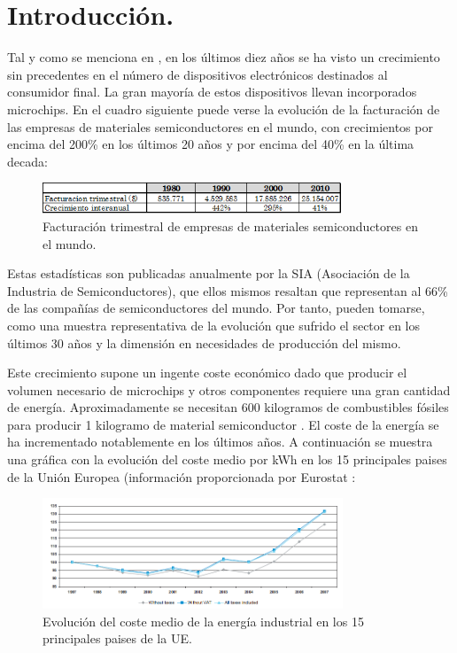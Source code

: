 \section{Introducción.}

Tal y como se menciona en \cite{reusing-silicon}, en los últimos diez años se ha visto un crecimiento sin 
precedentes en el número de dispositivos electrónicos destinados al consumidor final. La gran mayoría de estos dispositivos llevan incorporados microchips. En el cuadro siguiente puede verse la evolución de la facturación de las empresas de materiales semiconductores en el mundo, con crecimientos por encima del 200\% en los últimos 20 años y por encima del 40\% en la última decada:

\begin{figure}[H]
\begin{center}
\includegraphics[width=0.8\textwidth]{img/estadisticas_chips}
\caption{Facturación trimestral de empresas de materiales semiconductores en el mundo.}
\end{center}
\end{figure}

Estas estadísticas son publicadas anualmente por la SIA \cite{SIA} (Asociación de la Industria de Semiconductores), que ellos mismos resaltan que representan al 66\% de las compañías de semiconductores del mundo. Por tanto, pueden tomarse, como una muestra representativa de la evolución que sufrido el sector en los últimos 30 años y la dimensión en necesidades de producción del mismo.

Este crecimiento supone un ingente coste económico dado que producir el volumen necesario de microchips y otros componentes requiere una gran cantidad de energía. Aproximadamente se necesitan 600 kilogramos de combustibles fósiles para producir 1 kilogramo de material semiconductor \cite{reusing-silicon}. El coste de la energía se ha incrementado notablemente en los últimos años. A continuación se muestra una gráfica con la evolución del coste medio por kWh en los 15 principales paises de la Unión Europea (información proporcionada por Eurostat \cite{eurostat1}:

\begin{figure}[H]
\begin{center}
\includegraphics[width=0.8\textwidth]{img/precio_electricidad_industrial}
\caption{Evolución del coste medio de la energía industrial en los 15 principales paises de la UE.}
\end{center}
\end{figure}


